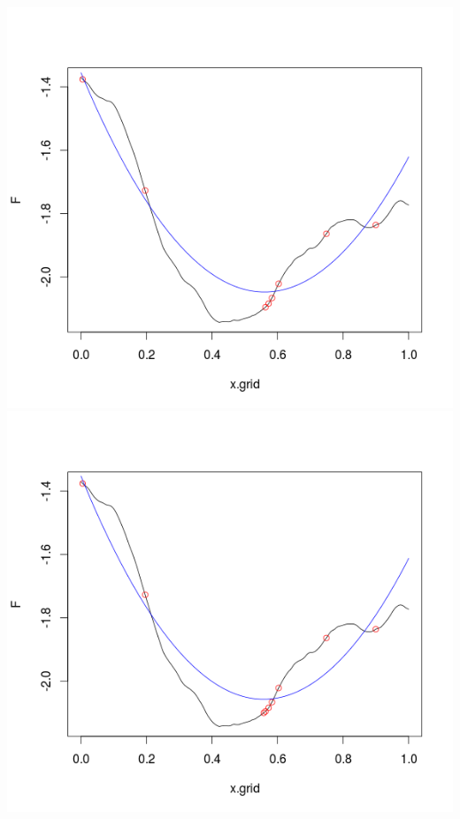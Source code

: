 \documentclass{beamer}
\begin{document}
\begin{frame}
\includegraphics[trim = 10mm 20mm 10mm 10mm, clip, width=.3\paperwidth]{fig/prs5.png}
\\
\includegraphics[trim = 10mm 20mm 10mm 10mm, clip, width=.3\paperwidth]{fig/prs6.png}

\end{frame}
\end{document}
